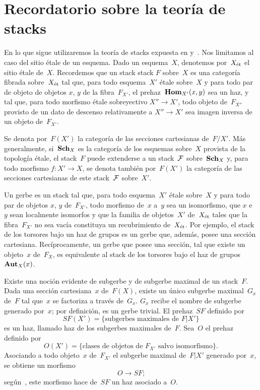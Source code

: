 
\section{Recordatorio sobre la teoría de stacks}
\label{XIII.0}

En lo que sigue utilizaremos la teoría de stacks expuesta en
\cite{XIII.1} y~\cite{XIII.2}. Nos limitamos al caso del sitio étale de un
esquema. Dado un esquema~$X$, denotemos por~$X_\et$ el sitio étale de~$X$.
Recordemos que un
{stack}
{stack $F$}
%
sobre~$X$ es una categoría fibrada sobre~$X_\et$ tal que, para todo
esquema~$X'$ étale sobre~$X$ y para todo par
{de objeto}
{de objetos}
$x$, $y$ de la fibra~$F_{X'}$, el prehaz~$\SheafHom_{X'}(x,y)$ sea un haz,
y tal que, para todo morfismo étale sobreyectivo $X''\to X'$, todo objeto
de~$F_{X''}$ provisto de un dato de descenso relativamente a $X''\to X'$
sea imagen inversa de un objeto de~$F_{X'}$.

Se denota por~$F(X')$ la categoría de las secciones cartesianas de~$F/X'$.
Más generalmente, si~$\Sch_X$ es la categoría de los esquemas sobre~$X$
provista de la topología étale, el stack~$F$ puede extenderse a un
stack~$\cal{F}$ sobre~$\Sch_X$ y, para todo morfismo $f\colon X'\to X$, se
denota también por~$F(X')$ la categoría de las secciones cartesianas de este
stack~$\cal{F}$ sobre~$X'$.

Un gerbe
%
es un stack tal que, para todo esquema~$X'$ étale sobre~$X$ y para todo par
de objetos $x$, $y$ de~$F_{X'}$, todo morfismo de~$x$ a~$y$ sea un
isomorfismo, que $x$ e~$y$ sean localmente isomorfos y que la familia de
objetos~$X'$ de~$X_\et$ tales que la fibra~$F_{X'}$ no sea vacía constituya
un recubrimiento de~$X_\et$. Por ejemplo, el stack de los torsores bajo un haz
de grupos es un gerbe que, además, posee una sección cartesiana.
Recíprocamente, un gerbe que posee una sección, \ie tal que existe un
objeto~$x$ de~$F_X$, es equivalente al stack de los torsores bajo el haz
de grupos~$\SheafAut_X(x)$.

Existe una noción evidente de subgerbe y de subgerbe maximal de un
stack~$F$. Dada una sección cartesiana~$x$ de~$F(X)$, existe un único
subgerbe maximal~$G_x$ de~$F$ tal que~$x$ se factoriza a través de~$G_x$.
$G_x$ recibe el nombre de subgerbe generado por~$x$; por definición, es un
gerbe trivial.
%
El prehaz~$SF$
\label{indnot:mb}%
definido por
$$
SF(X') = \{ \text{subgerbes maximales de }F|X' \}
$$
es un haz, llamado haz de los subgerbes maximales de~$F$.
%
Sea~$O$ el prehaz definido por
$$
O(X') = \{ \text{clases de objetos de }F_{X'}\text{ salvo isomorfismo}
\} \text{.}
$$
Asociando a todo objeto~$x$ de~$F_{X'}$ el subgerbe maximal de~$F|X'$
generado por~$x$, se obtiene un morfismo
$$
O \to SF \text{;}
$$
según~\cite[III 2.1.4]{XIII.2}, este morfismo hace de~$SF$ un haz asociado
a~$O$.

